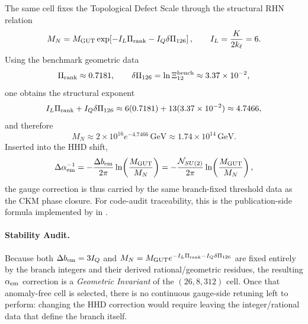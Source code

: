 \documentclass[11pt]{article}
\begin{document}
The same cell fixes the Topological Defect Scale through the structural RHN
relation
\begin{equation}
 M_N
 =
 M_{\rm GUT}\exp\!\left[-I_L\Pi_{\rm rank}-I_Q\delta\Pi_{126}\right],
 \qquad
 I_L=\frac{K}{2k_{\ell}}=6.
\end{equation}
Using the benchmark geometric data
\begin{equation}
 \Pi_{\rm rank}\approx 0.7181,
 \qquad
 \delta\Pi_{126}=\ln\Xi_{12}^{\rm bench}\approx 3.37\times10^{-2},
\end{equation}
one obtains the structural exponent
\begin{equation}
 I_L\Pi_{\rm rank}+I_Q\delta\Pi_{126}
 \approx
 6(0.7181)+13(3.37\times10^{-2})
 \approx 4.7466,
\end{equation}
and therefore
\begin{equation}
 M_N
 \approx
 2\times10^{16}e^{-4.7466}\,\mathrm{GeV}
 \approx 1.74\times10^{14}\,\mathrm{GeV}.
\end{equation}
Inserted into the HHD shift,
\begin{equation}
 \Delta\alpha_{\rm em}^{-1}
 =
 -\frac{\Delta b_{\rm em}}{2\pi}\ln\!\left(\frac{M_{\rm GUT}}{M_N}\right)
 =
 -\frac{\mathcal N_{SU(2)}}{2\pi}\ln\!\left(\frac{M_{\rm GUT}}{M_N}\right),
\end{equation}
the gauge correction is thus carried by the same branch-fixed threshold data as
the CKM phase closure. For code-audit traceability, this is the publication-side
formula implemented by  in
.

\paragraph{Stability Audit.}
Because both $\Delta b_{\rm em}=3I_Q$ and
$M_N=M_{\rm GUT}e^{-I_L\Pi_{\rm rank}-I_Q\delta\Pi_{126}}$ are fixed entirely by
the branch integers and their derived rational/geometric residues, the resulting
$\alpha_{\rm em}$ correction is a \emph{Geometric Invariant} of the
$(26,8,312)$ cell. Once that anomaly-free cell is selected, there is no
continuous gauge-side retuning left to perform: changing the HHD correction
would require leaving the integer/rational data that define the branch itself.
\end{document}
